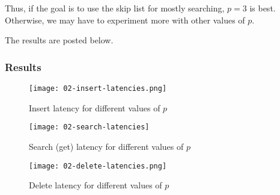 Thus, if the goal is to use the skip list for mostly searching, $p=3$ is best. Otherwise, we may have to experiment more with other values of $p$.

The results are posted below.

\subsubsection*{Results}

\begin{figure}[H]
	\begin{center}
		\texttt{[image: 02-insert-latencies.png]}
		\caption{Insert latency for different values of $p$}
		\label{fig:02-insert-latency}
	\end{center}
\end{figure}


\begin{figure}[H]
	\begin{center}
		\texttt{[image: 02-search-latencies]}
		\caption{Search (get) latency for different values of $p$}
		\label{fig:02-search-latency}
	\end{center}
\end{figure}


\begin{figure}[H]
	\begin{center}
		\texttt{[image: 02-delete-latencies.png]}
		\caption{Delete latency for different values of $p$}
		\label{fig:02-delete-latency}
	\end{center}
\end{figure}

